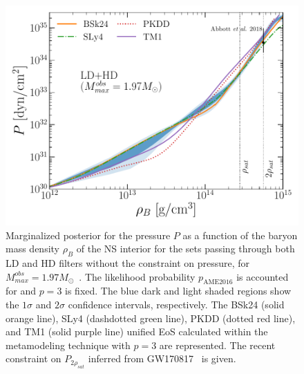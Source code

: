 \begin{figure}[!t]
\begin{center}
  \includegraphics[width=0.9\linewidth]{figures/eos_bayes.pdf}
\end{center}
\caption[Posterior equation of state confronted with popular models and 
the GW170817 event]{Marginalized posterior for the pressure 
  $P$ as a function of the baryon mass density $\rho_B$ of the NS interior for 
  the sets passing through both LD and HD filters without the constraint on 
  pressure, for $M_{max}^{obs} = 1.97M_\odot$~\cite{Antoniadis2013}. The 
  likelihood probability $p_{\text{AME2016}}$ is accounted for and $p=3$ is 
  fixed. The blue dark and light shaded regions show the $1\sigma$ and $2\sigma$ 
  confidence intervals, respectively. The BSk24 (solid orange line), SLy4
  (dashdotted green line), PKDD (dotted red line), and TM1 (solid purple line) 
  unified EoS calculated within the metamodeling technique with $p=3$ are 
  represented. The recent constraint on $P_{2\rho_{sat}}$ inferred from 
  GW170817~\cite{GW1} is given.}\label{fig:eos_bayes}
\end{figure}

